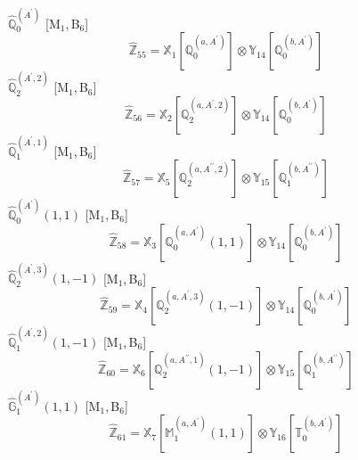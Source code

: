 \documentclass[fleqn,10pt,landscape]{article}
\begin{document}
\begin{itemize}
\noindent {} $\,\,\,\hat{\mathbb{Q}}_{0}^{(A^{\prime})}$ [M$_{1}$,\,B$_{6}$]
\begin{dmath*}
\hat{\mathbb{Z}}_{55}=\mathbb{X}_{1}[\mathbb{Q}_{0}^{(a,A^{\prime})}] \otimes\mathbb{Y}_{14}[\mathbb{Q}_{0}^{(b,A^{\prime})}]
\end{dmath*}
\vspace{4mm}
\noindent {} $\,\,\,\hat{\mathbb{Q}}_{2}^{(A^{\prime},2)}$ [M$_{1}$,\,B$_{6}$]
\begin{dmath*}
\hat{\mathbb{Z}}_{56}=\mathbb{X}_{2}[\mathbb{Q}_{2}^{(a,A^{\prime},2)}] \otimes\mathbb{Y}_{14}[\mathbb{Q}_{0}^{(b,A^{\prime})}]
\end{dmath*}
\vspace{4mm}
\noindent {} $\,\,\,\hat{\mathbb{Q}}_{1}^{(A^{\prime},1)}$ [M$_{1}$,\,B$_{6}$]
\begin{dmath*}
\hat{\mathbb{Z}}_{57}=\mathbb{X}_{5}[\mathbb{Q}_{2}^{(a,A^{\prime\prime},2)}] \otimes\mathbb{Y}_{15}[\mathbb{Q}_{1}^{(b,A^{\prime\prime})}]
\end{dmath*}
\vspace{4mm}
\noindent {} $\,\,\,\hat{\mathbb{Q}}_{0}^{(A^{\prime})}(1,1)$ [M$_{1}$,\,B$_{6}$]
\begin{dmath*}
\hat{\mathbb{Z}}_{58}=\mathbb{X}_{3}[\mathbb{Q}_{0}^{(a,A^{\prime})}(1,1)] \otimes\mathbb{Y}_{14}[\mathbb{Q}_{0}^{(b,A^{\prime})}]
\end{dmath*}
\vspace{4mm}
\noindent {} $\,\,\,\hat{\mathbb{Q}}_{2}^{(A^{\prime},3)}(1,-1)$ [M$_{1}$,\,B$_{6}$]
\begin{dmath*}
\hat{\mathbb{Z}}_{59}=\mathbb{X}_{4}[\mathbb{Q}_{2}^{(a,A^{\prime},3)}(1,-1)] \otimes\mathbb{Y}_{14}[\mathbb{Q}_{0}^{(b,A^{\prime})}]
\end{dmath*}
\vspace{4mm}
\noindent {} $\,\,\,\hat{\mathbb{Q}}_{1}^{(A^{\prime},2)}(1,-1)$ [M$_{1}$,\,B$_{6}$]
\begin{dmath*}
\hat{\mathbb{Z}}_{60}=\mathbb{X}_{6}[\mathbb{Q}_{2}^{(a,A^{\prime\prime},1)}(1,-1)] \otimes\mathbb{Y}_{15}[\mathbb{Q}_{1}^{(b,A^{\prime\prime})}]
\end{dmath*}
\vspace{4mm}
\noindent {} $\,\,\,\hat{\mathbb{G}}_{1}^{(A^{\prime})}(1,1)$ [M$_{1}$,\,B$_{6}$]
\begin{dmath*}
\hat{\mathbb{Z}}_{61}=\mathbb{X}_{7}[\mathbb{M}_{1}^{(a,A^{\prime})}(1,1)] \otimes\mathbb{Y}_{16}[\mathbb{T}_{0}^{(b,A^{\prime})}]

\end{dmath*}
\end{itemize}
\end{document}
